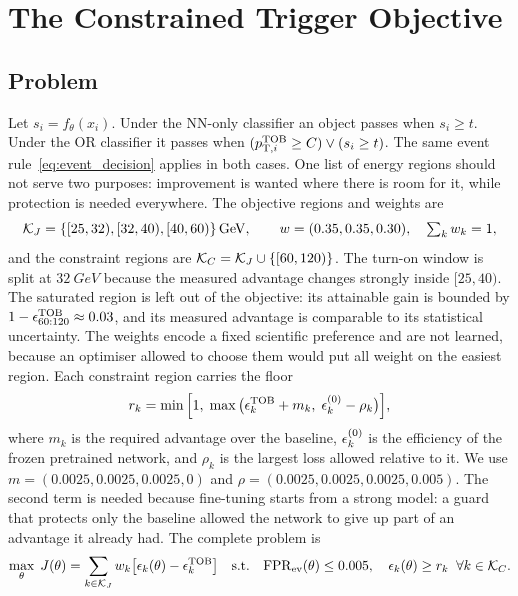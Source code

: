 \section{The Constrained Trigger Objective}
\label{app:constrained}

\subsection{Problem}
Let $s_i=f_\theta(x_i)$. Under the NN-only classifier an object passes when $s_i\geq t$. Under the OR classifier it passes when $(p_{\mathrm{T},i}^{\mathrm{TOB}}\geq C)\vee(s_i\geq t)$. The same event rule~\eqref{eq:event_decision} applies in both cases. One list of energy regions should not serve two purposes: improvement is wanted where there is room for it, while protection is needed everywhere. The objective regions and weights are
\begin{equation}
  \mathcal{K}_J=\{[25,32),[32,40),[40,60)\}\,\mathrm{GeV},\qquad w=(0.35,0.35,0.30),\quad\textstyle\sum_k w_k=1,
\end{equation}
and the constraint regions are $\mathcal{K}_C=\mathcal{K}_J\cup\{[60,120)\}$. The turn-on window is split at $\SI{32}{GeV}$ because the measured advantage changes strongly inside $[25,40)$. The saturated region is left out of the objective: its attainable gain is bounded by $1-\epsilon^{\mathrm{TOB}}_{60:120}\approx0.03$, and its measured advantage is comparable to its statistical uncertainty. The weights encode a fixed scientific preference and are not learned, because an optimiser allowed to choose them would put all weight on the easiest region. Each constraint region carries the floor
\begin{equation}
  r_k=\min\Big[1,\;\max\big(\epsilon^{\mathrm{TOB}}_k+m_k,\;\epsilon_k^{(0)}-\rho_k\big)\Big],
  \label{eq:floor}
\end{equation}
where $m_k$ is the required advantage over the baseline, $\epsilon_k^{(0)}$ is the efficiency of the frozen pretrained network, and $\rho_k$ is the largest loss allowed relative to it. We use $m=(0.0025,0.0025,0.0025,0)$ and $\rho=(0.0025,0.0025,0.0025,0.005)$. The second term is needed because fine-tuning starts from a strong model: a guard that protects only the baseline allowed the network to give up part of an advantage it already had. The complete problem is
\begin{equation}
  \max_\theta\;J(\theta)=\sum_{k\in\mathcal{K}_J}w_k\big[\epsilon_k(\theta)-\epsilon^{\mathrm{TOB}}_k\big]
  \quad\text{s.t.}\quad\mathrm{FPR}_{\mathrm{ev}}(\theta)\leq0.005,\quad\epsilon_k(\theta)\geq r_k\;\;\forall k\in\mathcal{K}_C .
\end{equation}

